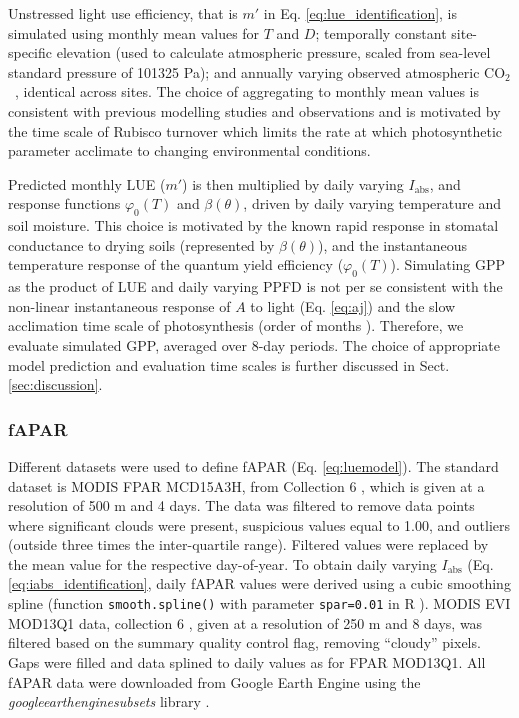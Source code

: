 \documentclass[gmd, manuscript]{copernicus}
\newcommand{\coo}{CO$_2$}
\begin{document}
Unstressed light use efficiency, that is $m'$ in Eq. \ref{eq:lue_identification}, is simulated using monthly mean values for $T$ and $D$; temporally constant site-specific elevation (used to calculate atmospheric pressure, scaled from sea-level standard pressure of 101325 Pa); and annually varying observed atmospheric \coo\ \citep{MacFarlingMeure2006}, identical across sites. The choice of aggregating to monthly mean values is consistent with previous modelling studies \citet{maire12po} and observations \citep{suzuki01} and is motivated by the time scale of Rubisco turnover which limits the rate at which photosynthetic parameter acclimate to changing environmental conditions.

Predicted monthly LUE ($m'$) is then multiplied by daily varying $I_\text{abs}$, and response functions $\varphi_0(T)$ and $\beta(\theta)$, driven by daily varying temperature and soil moisture. This choice is motivated by the known rapid response in stomatal conductance to drying soils (represented by $\beta(\theta)$), and the instantaneous temperature response of the quantum yield efficiency ($\varphi_0(T)$). Simulating GPP as the product of LUE and daily varying PPFD is not per se consistent with the non-linear instantaneous response of $A$ to light (Eq. \ref{eq:aj}) and the slow acclimation time scale of photosynthesis (order of months \citep{suzuki01, maire12po}). Therefore, we evaluate simulated GPP, averaged over 8-day periods. The choice of appropriate model prediction and evaluation time scales is further discussed in Sect. \ref{sec:discussion}.  

\subsubsection{fAPAR}
\label{sec:greennessdata}

Different datasets were used to define fAPAR (Eq. \ref{eq:luemodel}). The standard dataset is MODIS FPAR MCD15A3H, from Collection 6 \citep{modis_fpar_6}, which is given at a resolution of 500 m and 4 days. The data was filtered to remove data points where significant clouds were present, suspicious values equal to 1.00, and outliers (outside three times the inter-quartile range). Filtered values were replaced by the mean value for the respective day-of-year. To obtain daily varying $I_\text{abs}$ (Eq. \ref{eq:iabs_identification}, daily fAPAR values were derived using a cubic smoothing spline (function \texttt{smooth.spline()} with parameter \texttt{spar=0.01} in R \citep{Rcoreteam}). MODIS EVI MOD13Q1 data, collection 6 \citep{modis_evi_6}, given at a resolution of 250 m and 8 days, was filtered based on the summary quality control flag, removing ``cloudy'' pixels. Gaps were filled and data splined to daily values as for FPAR MOD13Q1. All fAPAR data were downloaded from Google Earth Engine using the \textit{google\textunderscore earth\textunderscore engine\textunderscore subsets} library \citep{gee_subset}. 
\end{document}
